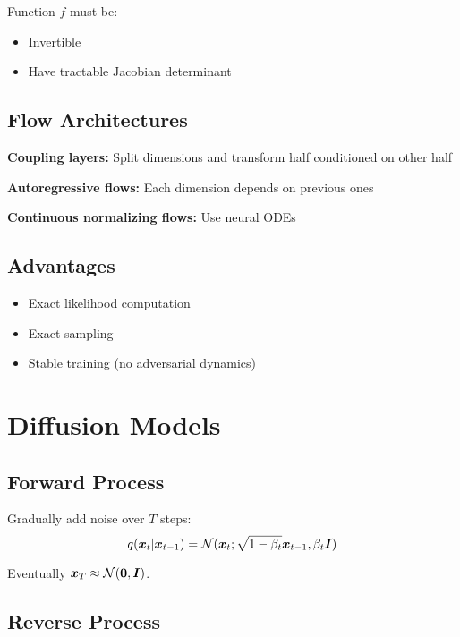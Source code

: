 Function $f$ must be:
\begin{itemize}
    \item Invertible
    \item Have tractable Jacobian determinant
\end{itemize}

\subsection{Flow Architectures}

\textbf{Coupling layers:} Split dimensions and transform half conditioned on other half

\textbf{Autoregressive flows:} Each dimension depends on previous ones

\textbf{Continuous normalizing flows:} Use neural ODEs

\subsection{Advantages}

\begin{itemize}
    \item Exact likelihood computation
    \item Exact sampling
    \item Stable training (no adversarial dynamics)
\end{itemize}

\section{Diffusion Models}
\label{sec:diffusion-models}

\subsection{Forward Process}

Gradually add noise over $T$ steps:
\begin{equation}
q(\boldsymbol{x}_t|\boldsymbol{x}_{t-1}) = \mathcal{N}(\boldsymbol{x}_t; \sqrt{1-\beta_t} \boldsymbol{x}_{t-1}, \beta_t \boldsymbol{I})
\end{equation}

Eventually $\boldsymbol{x}_T \approx \mathcal{N}(\boldsymbol{0}, \boldsymbol{I})$.

\subsection{Reverse Process}


